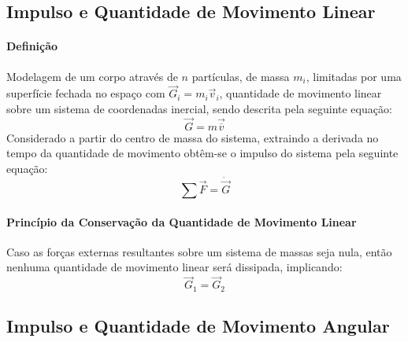 \documentclass{article}
\begin{document}
        \subsection{Impulso e Quantidade de Movimento Linear}
            \paragraph{Definição}Modelagem de um corpo através de $n$ partículas, de massa $m_{i}$, limitadas por uma superfície fechada no espaço com $\vec{G}_{i} = m_{i} \vec{v}_{i}$, quantidade de movimento linear sobre um sistema de coordenadas inercial, sendo descrita pela seguinte equação:
                \begin{equation}
                    \boxed{
                        \vec{G} = m \vec{\overline{v}}
                    }
                \end{equation}
            Considerado a partir do centro de massa do sistema, extraindo a derivada no tempo da quantidade de movimento obtêm-se o impulso do sistema pela seguinte equação:
                \begin{equation}
                    \boxed{
                        \sum\vec{F} = \dot{\vec{G}}
                    }
                \end{equation}

            \paragraph{Princípio da Conservação da Quantidade de Movimento Linear}Caso as forças externas resultantes sobre um sistema de massas seja nula, então nenhuma quantidade de movimento linear será dissipada, implicando:
                \begin{equation}
                    \boxed{
                        \vec{G}_{1} = \vec{G}_{2}
                    }
                \end{equation}

        \subsection{Impulso e Quantidade de Movimento Angular}
\end{document}
